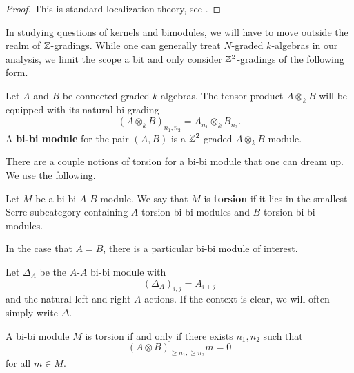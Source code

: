 \documentclass[dissertation.tex]{subfiles}
\begin{document}
\begin{proof}
  This is standard localization theory, see \cite{Stenstrom}.
\end{proof}

In studying questions of kernels and bimodules, we will have to move outside the realm of \(\mathbb{Z}\)-gradings. While one can generally treat \(N\)-graded \(k\)-algebras in our analysis, we limit the scope a bit and only consider \(\mathbb{Z}^2\)-gradings of the following form.

\begin{definition}
  Let \(A\) and \(B\) be connected graded \(k\)-algebras. The tensor product \(A \otimes_k B\) will be equipped with its natural bi-grading 
  \begin{displaymath}
    (A \otimes_k B)_{n_1,n_2} = A_{n_1} \otimes_k B_{n_2}. 
  \end{displaymath}
  A \textbf{bi-bi module} for the pair \((A,B)\) is a \(\mathbb{Z}^2\)-graded \(A \otimes_k B\) module. 
\end{definition}

There are a couple notions of torsion for a bi-bi module that one can dream up. We use the following.

\begin{definition}
  Let \(M\) be a bi-bi \(A\)-\(B\) module. We say that \(M\) is \textbf{torsion} if it lies in the smallest Serre subcategory containing \(A\)-torsion bi-bi modules and \(B\)-torsion bi-bi modules.
\end{definition}

In the case that \(A=B\), there is a particular bi-bi module of interest.

\begin{definition}
  Let \(\Delta_A\) be the \(A\)-\(A\) bi-bi module with 
  \begin{displaymath}
    (\Delta_A)_{i,j} = A_{i+j}
  \end{displaymath}
  and the natural left and right \(A\) actions. If the context is clear, we will often simply write \(\Delta\). 
\end{definition}

\begin{lemma} \label{lemma: alternate char of bibi torsion}
  A bi-bi module \(M\) is torsion if and only if there exists \(n_1,n_2\) such that 
  \begin{displaymath}
    (A \otimes B)_{\geq n_1, \geq n_2} m = 0
  \end{displaymath}
  for all \(m \in M\).
\end{lemma}
\end{document}
